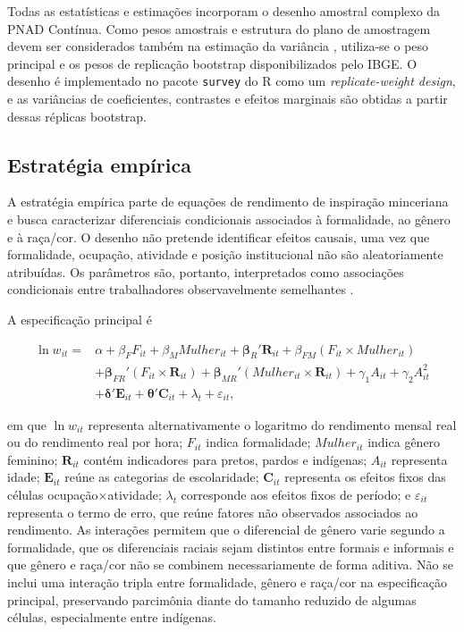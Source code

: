 \documentclass[12pt,a4paper]{article}
\begin{document}
Todas as estatísticas e estimações incorporam o desenho amostral complexo da
PNAD Contínua. Como pesos amostrais e estrutura do plano de amostragem devem ser
considerados também na estimação da variância
\citep{lumley2004analysis,lumley2010complex}, utiliza-se o peso principal e os 
pesos de replicação bootstrap disponibilizados pelo IBGE. O desenho é
implementado no pacote \texttt{survey} do R como um
\textit{replicate-weight design}, e as variâncias de coeficientes, contrastes e
efeitos marginais são obtidas a partir dessas réplicas bootstrap.

\subsection{Estratégia empírica}
\label{subsec:estrategia}

A estratégia empírica parte de equações de rendimento de inspiração minceriana
\citep{mincer1974schooling} e busca caracterizar diferenciais condicionais
associados à formalidade, ao gênero e à raça/cor. O desenho não pretende
identificar efeitos causais, uma vez que formalidade, ocupação, atividade e
posição institucional não são aleatoriamente atribuídas. Os parâmetros são,
portanto, interpretados como associações condicionais entre trabalhadores
observavelmente semelhantes \citep{wooldridge2010econometric}.

A especificação principal é

\begin{align}
\ln w_{it}
={}&
\alpha
+\beta_F F_{it}
+\beta_M Mulher_{it}
+\boldsymbol{\beta}_{R}'\mathbf{R}_{it}
+\beta_{FM}(F_{it}\times Mulher_{it})
\nonumber\\
&+
\boldsymbol{\beta}_{FR}'(F_{it}\times\mathbf{R}_{it})
+
\boldsymbol{\beta}_{MR}'(Mulher_{it}\times\mathbf{R}_{it})
+\gamma_1 A_{it}
+\gamma_2 A_{it}^{2}
\nonumber\\
&+
\boldsymbol{\delta}'\mathbf{E}_{it}
+
\boldsymbol{\theta}'\mathbf{C}_{it}
+\lambda_t
+\varepsilon_{it},
\label{eq:modelo_principal}
\end{align}

\noindent
em que $\ln w_{it}$ representa alternativamente o logaritmo do rendimento
mensal real ou do rendimento real por hora; $F_{it}$ indica formalidade; $Mulher_{it}$ indica gênero feminino;
$\mathbf{R}_{it}$ contém indicadores para pretos, pardos e indígenas;
$A_{it}$ representa idade; $\mathbf{E}_{it}$ reúne as categorias de
escolaridade; $\mathbf{C}_{it}$ representa os efeitos fixos das células
ocupação$\times$atividade; $\lambda_t$ corresponde aos efeitos fixos de
período; e $\varepsilon_{it}$ representa o termo de erro, que reúne fatores não observados associados ao rendimento. 
As interações permitem que o diferencial de gênero varie segundo a
formalidade, que os diferenciais raciais sejam distintos entre formais e
informais e que gênero e raça/cor não se combinem necessariamente de forma
aditiva. Não se inclui uma interação tripla entre formalidade, gênero e raça/cor
na especificação principal, preservando parcimônia diante do tamanho reduzido
de algumas células, especialmente entre indígenas.
\end{document}
